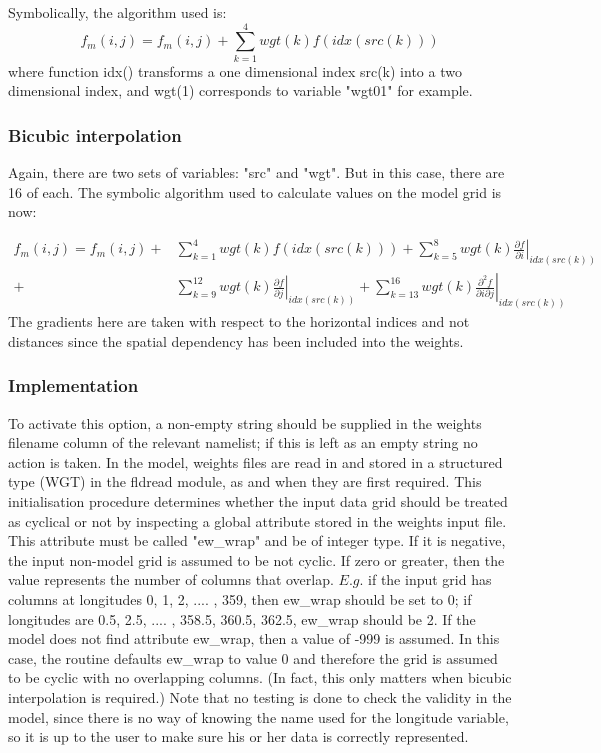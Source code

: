 \documentclass[../main/NEMO_manual]{subfiles}
\begin{document}
Symbolically, the algorithm used is:
\[
  f_{m}(i,j) = f_{m}(i,j) + \sum_{k=1}^{4} {wgt(k)f(idx(src(k)))}
\]
where function idx() transforms a one dimensional index src(k) into a two dimensional index,
and wgt(1) corresponds to variable "wgt01" for example.

\subsubsection{Bicubic interpolation}
\label{subsec:SBC_iof_bicubic}

Again, there are two sets of variables: "src" and "wgt".
But in this case, there are 16 of each.
The symbolic algorithm used to calculate values on the model grid is now:

\[
  \begin{split}
    f_{m}(i,j) =  f_{m}(i,j) +& \sum_{k=1}^{4} {wgt(k)f(idx(src(k)))}
    +  \sum_{k=5 }^{8 } {wgt(k)\left.\frac{\partial f}{\partial i}\right| _{idx(src(k))} }    \\
    +& \sum_{k=9 }^{12} {wgt(k)\left.\frac{\partial f}{\partial j}\right| _{idx(src(k))} }
    +  \sum_{k=13}^{16} {wgt(k)\left.\frac{\partial ^2 f}{\partial i \partial j}\right| _{idx(src(k))} }
  \end{split}
\]
The gradients here are taken with respect to the horizontal indices and not distances since
the spatial dependency has been included into the weights.

\subsubsection{Implementation}
\label{subsec:SBC_iof_imp}

To activate this option, a non-empty string should be supplied in
the weights filename column of the relevant namelist;
if this is left as an empty string no action is taken.
In the model, weights files are read in and stored in a structured type (WGT) in the fldread module,
as and when they are first required.
This initialisation procedure determines whether the input data grid should be treated as cyclical or not by
inspecting a global attribute stored in the weights input file.
This attribute must be called "ew\_wrap" and be of integer type.
If it is negative, the input non-model grid is assumed to be not cyclic.
If zero or greater, then the value represents the number of columns that overlap.
$E.g.$ if the input grid has columns at longitudes 0, 1, 2, .... , 359, then ew\_wrap should be set to 0;
if longitudes are 0.5, 2.5, .... , 358.5, 360.5, 362.5, ew\_wrap should be 2.
If the model does not find attribute ew\_wrap, then a value of -999 is assumed.
In this case, the  routine defaults ew\_wrap to value 0 and
therefore the grid is assumed to be cyclic with no overlapping columns.
(In fact, this only matters when bicubic interpolation is required.)
Note that no testing is done to check the validity in the model,
since there is no way of knowing the name used for the longitude variable,
so it is up to the user to make sure his or her data is correctly represented.
\end{document}
